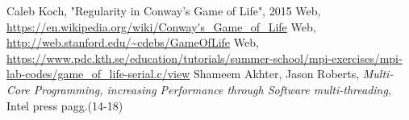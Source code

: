\documentclass[a4paper,11pt,twoside]{report}
\begin{document}
\begin{thebibliography}{9}
 Caleb Koch, "Regularity in Conway's Game of Life", 2015
 Web, \url{https://en.wikipedia.org/wiki/Conway's_Game_of_Life}
 Web, \url{http://web.stanford.edu/~cdebs/GameOfLife}
 Web, \url{https://www.pdc.kth.se/education/tutorials/summer-school/mpi-exercises/mpi-lab-codes/game_of_life-serial.c/view}
 Shameem Akhter, Jason Roberts, \emph{Multi-Core Programming, increasing Performance through Software multi-threading}, Intel press pagg.(14-18)
\end{thebibliography}
\end{document}
